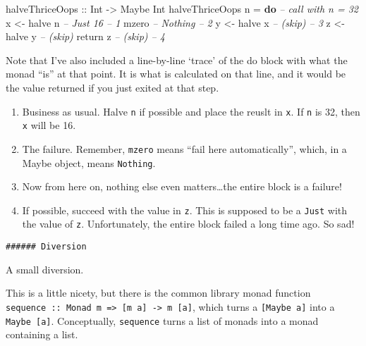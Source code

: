 \documentclass[]{article}
\newenvironment{Shaded}{}{}
\newcommand{\KeywordTok}[1]{\textcolor[rgb]{0.00,0.44,0.13}{\textbf{{#1}}}}
\newcommand{\DataTypeTok}[1]{\textcolor[rgb]{0.56,0.13,0.00}{{#1}}}
\newcommand{\CommentTok}[1]{\textcolor[rgb]{0.38,0.63,0.69}{\textit{{#1}}}}
\newcommand{\OtherTok}[1]{\textcolor[rgb]{0.00,0.44,0.13}{{#1}}}
\newcommand{\FunctionTok}[1]{\textcolor[rgb]{0.02,0.16,0.49}{{#1}}}
\newcommand{\NormalTok}[1]{{#1}}
\begin{document}
\begin{Shaded}
\begin{Highlighting}[]
\OtherTok{halveThriceOops ::} \DataTypeTok{Int} \OtherTok{->} \DataTypeTok{Maybe} \DataTypeTok{Int}
\NormalTok{halveThriceOops n }\FunctionTok{=} \KeywordTok{do}          \CommentTok{-- call with n = 32}
    \NormalTok{x }\OtherTok{<-} \NormalTok{halve n                }\CommentTok{-- Just 16              -- 1}
    \NormalTok{mzero                       }\CommentTok{-- Nothing              -- 2}
    \NormalTok{y }\OtherTok{<-} \NormalTok{halve x                }\CommentTok{-- (skip)               -- 3}
    \NormalTok{z }\OtherTok{<-} \NormalTok{halve y                }\CommentTok{-- (skip)}
    \NormalTok{return z                    }\CommentTok{-- (skip)               -- 4}
\end{Highlighting}
\end{Shaded}

Note that I've also included a line-by-line `trace' of the do block with what the monad ``is'' at
that point. It is what is calculated on that line, and it would be the value returned if you just
exited at that step.

\begin{enumerate}
\def\labelenumi{\arabic{enumi}.}
\tightlist
\item
  Business as usual. Halve \texttt{n} if possible and place the reuslt in \texttt{x}. If \texttt{n}
  is 32, then \texttt{x} will be 16.
\item
  The failure. Remember, \texttt{mzero} means ``fail here automatically'', which, in a Maybe object,
  means \texttt{Nothing}.
\item
  Now from here on, nothing else even matters\ldots{}the entire block is a failure!
\item
  If possible, succeed with the value in \texttt{z}. This is supposed to be a \texttt{Just} with the
  value of \texttt{z}. Unfortunately, the entire block failed a long time ago. So sad!
\end{enumerate}

\begin{verbatim}
###### Diversion
\end{verbatim}

A small diversion.

This is a little nicety, but there is the common library monad function
\texttt{sequence\ ::\ Monad\ m\ =\textgreater{}\ {[}m\ a{]}\ -\textgreater{}\ m\ {[}a{]}}, which
turns a \texttt{{[}Maybe\ a{]}} into a \texttt{Maybe\ {[}a{]}}. Conceptually, \texttt{sequence}
turns a list of monads into a monad containing a list.
\end{document}
